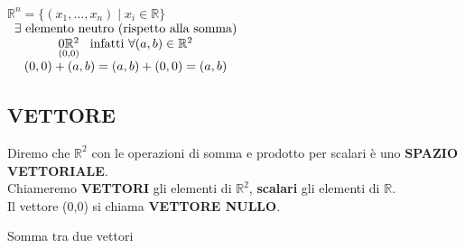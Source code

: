 \(
\mathbb{R}^n = \{ (x_1, \dots , x_n) \mid x_i \in \mathbb{R}\}
\)\\

\(
\begin{array}{c}
\exists \text{ elemento neutro (rispetto alla somma)} \\
\underset{(0,0)}{0\mathbb{R}^2} \hspace{0.3cm} \text{infatti }\forall (a, b) \in \mathbb{R}^2 \\
(0, 0) + (a, b) = (a, b) + (0,0) = (a, b)
\end{array}
\)


\subsection{VETTORE}

\begin{definition}[Vettore]
	Diremo che $\mathbb{R}^2$ con le operazioni di somma e prodotto per scalari è uno \textbf{SPAZIO VETTORIALE}. \\ Chiameremo \textbf{VETTORI} gli elementi di $\mathbb{R}^2$, \textbf{scalari} gli elementi di $\mathbb{R}$. \\ Il vettore (0,0) si chiama \textbf{VETTORE NULLO}.
\end{definition}
\textsf{\small Somma tra due vettori}

